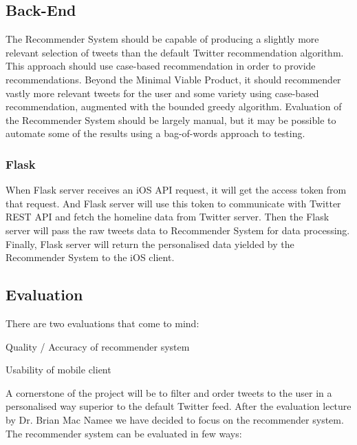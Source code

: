 \documentclass{article}
\begin{document}
\subsection{Back-End}

The Recommender System should be capable of producing a slightly more relevant selection of tweets than the default Twitter recommendation algorithm. This approach should use case-based recommendation in order to provide recommendations. Beyond the Minimal Viable Product, it should recommender vastly more relevant tweets for the user and some variety using case-based recommendation, augmented with the bounded greedy algorithm. Evaluation of the Recommender System should be largely manual, but it may be possible to automate some of the results using a bag-of-words approach to testing.

\subsubsection*{Flask}
When Flask server receives an iOS API request, it will get the access token from that request. And Flask server will use this token to communicate with Twitter REST API and fetch the homeline data from Twitter server. Then the Flask server will pass the raw tweets data to Recommender System for data processing. Finally, Flask server will return the personalised data yielded by the Recommender System to the iOS client.

\subsection{Evaluation}

There are two evaluations that come to mind:

\begin{itemize*}
	\item Quality / Accuracy of recommender system
	\item Usability of mobile client
\end{itemize*}

A cornerstone of the project will be to filter and order tweets to the user in a personalised way superior to the default Twitter feed. After the evaluation lecture by Dr. Brian Mac Namee we have decided to focus on the recommender system. The recommender system can be evaluated in few ways:
\end{document}
